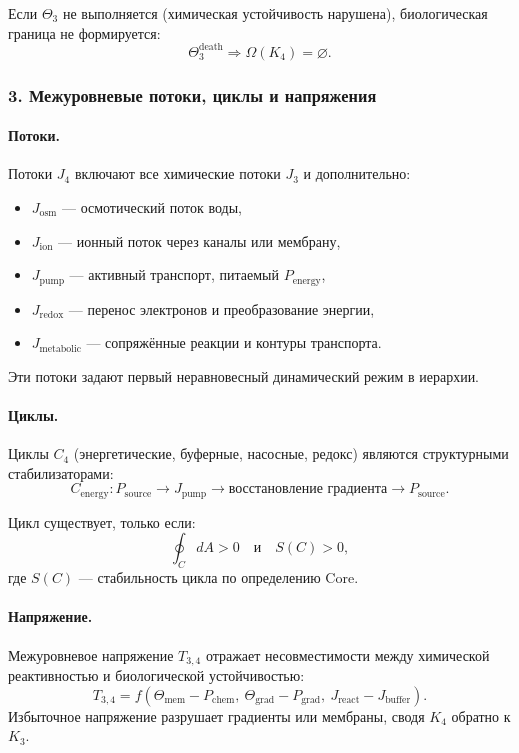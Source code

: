 Если $\Theta_3$ не выполняется (химическая устойчивость нарушена), биологическая
граница не формируется:
\[
\Theta_3^{\mathrm{death}} \Rightarrow \Omega(K_4)=\varnothing.
\]

\subsubsection{3. Межуровневые потоки, циклы и напряжения}

\paragraph{Потоки.}
Потоки $J_4$ включают все химические потоки $J_3$ и дополнительно:
\begin{itemize}
  \item $J_{\mathrm{osm}}$ — осмотический поток воды,
  \item $J_{\mathrm{ion}}$ — ионный поток через каналы или мембрану,
  \item $J_{\mathrm{pump}}$ — активный транспорт, питаемый $P_{\mathrm{energy}}$,
  \item $J_{\mathrm{redox}}$ — перенос электронов и преобразование энергии,
  \item $J_{\mathrm{metabolic}}$ — сопряжённые реакции и контуры транспорта.
\end{itemize}

Эти потоки задают первый неравновесный динамический режим в иерархии.

\paragraph{Циклы.}
Циклы $C_4$ (энергетические, буферные, насосные, редокс) являются
структурными стабилизаторами:
\[
C_{\mathrm{energy}} : P_{\mathrm{source}} \rightarrow J_{\mathrm{pump}}
\rightarrow \text{восстановление градиента} \rightarrow P_{\mathrm{source}}.
\]

Цикл существует, только если:
\[
\oint_C dA > 0 \quad\text{и}\quad S(C) > 0,
\]
где $S(C)$ — стабильность цикла по определению Core.

\paragraph{Напряжение.}
Межуровневое напряжение $T_{3,4}$ отражает несовместимости между
химической реактивностью и биологической устойчивостью:
\[
T_{3,4} = f(\Theta_{\mathrm{mem}} - P_{\mathrm{chem}},\
           \Theta_{\mathrm{grad}} - P_{\mathrm{grad}},\
           J_{\mathrm{react}} - J_{\mathrm{buffer}}).
\]
Избыточное напряжение разрушает градиенты или мембраны,
сводя $K_4$ обратно к $K_3$.

